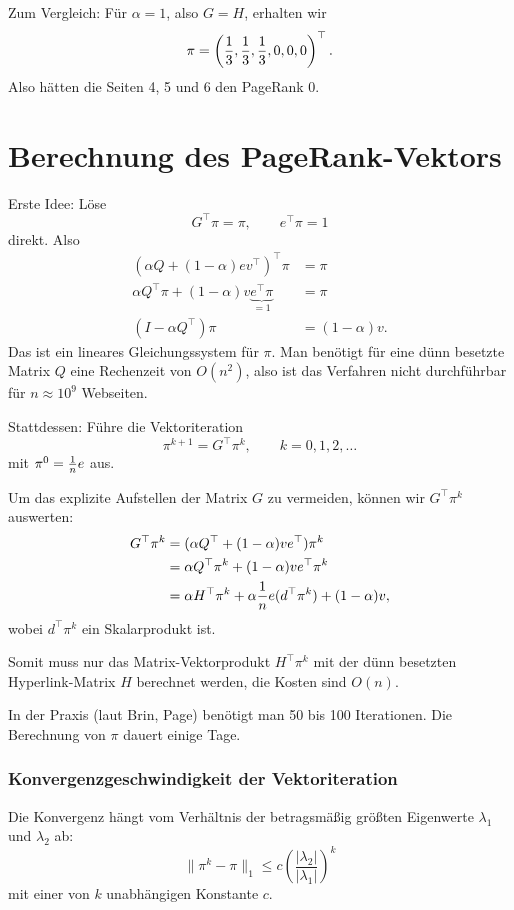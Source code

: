 Zum Vergleich: Für $\alpha = 1$, also $G = H$, erhalten wir
\[ \pi = \left( \frac{1}{3}, \frac{1}{3}, \frac{1}{3}, 0, 0, 0 \right)^\top. \]
Also hätten die Seiten 4, 5 und 6 den PageRank 0.

\section{Berechnung des PageRank-Vektors}
Erste Idee: Löse
\[ G^\top \pi = \pi, \qquad
  e^\top \pi = 1 \]
direkt. Also
\begin{align*}
  (\alpha Q + (1-\alpha) ev^\top)^\top \pi &= \pi \\
  \alpha Q^\top \pi + (1-\alpha) v \underbrace{e^\top \pi}_{=1} &= \pi \\
  (I - \alpha Q^\top) \pi &= (1-\alpha) v.
\end{align*}
Das ist ein lineares Gleichungssystem für $\pi$. Man benötigt für eine dünn
besetzte Matrix $Q$ eine Rechenzeit von $O(n^2)$, also ist das Verfahren nicht
durchführbar für $n \approx 10^9$ Webseiten.

Stattdessen: Führe die Vektoriteration
\[ \pi^{k+1} = G^\top \pi^k, \qquad k = 0, 1, 2, \ldots \]
mit $\pi^0 = \frac{1}{n} e$ aus.

Um das explizite Aufstellen der Matrix $G$ zu vermeiden, können wir $G^\top
\pi^k$ auswerten:
\begin{align*}
  G^\top \pi^k
  &= (\alpha Q^\top + (1-\alpha)ve^\top) \pi^k \\
  &= \alpha Q^\top \pi^k + (1-\alpha) ve^\top \pi^k \\
  &= \alpha H^\top \pi^k + \alpha \frac{1}{n} e(d^\top \pi^k) + (1-\alpha) v,
\end{align*}
wobei $d^\top \pi^k$ ein Skalarprodukt ist.

Somit muss nur das Matrix-Vektorprodukt $H^\top \pi^k$ mit der dünn besetzten
Hyperlink-Matrix $H$ berechnet werden, die Kosten sind $O(n)$.

In der Praxis (laut Brin, Page) benötigt man 50 bis 100 Iterationen. Die
Berechnung von $\pi$ dauert einige Tage.

\subsubsection*{Konvergenzgeschwindigkeit der Vektoriteration}
Die Konvergenz hängt vom Verhältnis der betragsmäßig größten Eigenwerte
$\lambda_1$ und $\lambda_2$ ab:
\[ \| \pi^k - \pi \|_1 \le c \left( \frac{|\lambda_2|}{|\lambda_1|} \right)^k \]
mit einer von $k$ unabhängigen Konstante $c$.

